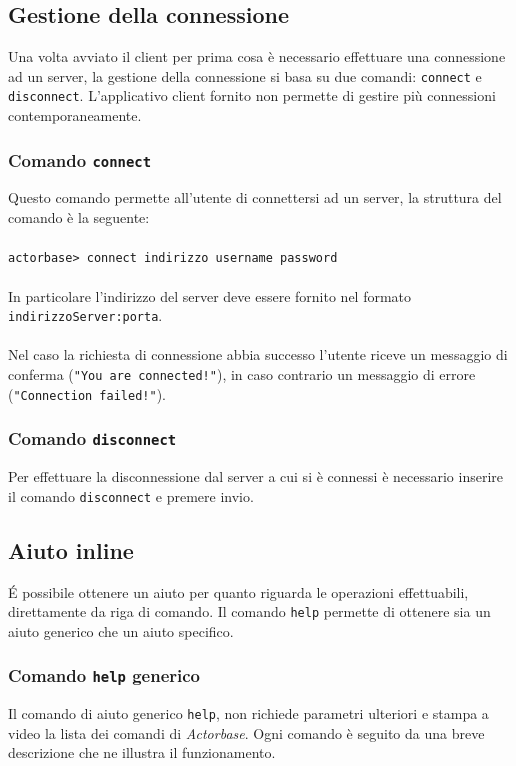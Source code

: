 \documentclass[a4paper]{article}
\begin{document}
	\subsection{Gestione della connessione}
	Una volta avviato il client per prima cosa è necessario effettuare una connessione ad un server, la gestione della connessione si basa su due comandi: \texttt{connect} e \texttt{disconnect}. L'applicativo client fornito non permette di gestire più connessioni contemporaneamente.
	
	\subsubsection{Comando \texttt{connect}}
	Questo comando permette all'utente di connettersi ad un server, la struttura del comando è la seguente:
	\\ \\
	\texttt{actorbase>	connect indirizzo username password}
	\\ \\
	In particolare l'indirizzo del server deve essere fornito nel formato \texttt{indirizzoServer:porta}. \\ \\
	Nel caso la richiesta di connessione abbia successo l'utente riceve un messaggio di conferma (\texttt{"You are connected!"}), in caso contrario un messaggio di errore (\texttt{"Connection failed!"}).
	
	\subsubsection{Comando \texttt{disconnect}}
	Per effettuare la disconnessione dal server a cui si è connessi è necessario inserire il comando \texttt{disconnect} e premere invio.
	

	\subsection{Aiuto inline}
	\'E possibile ottenere un aiuto per quanto riguarda le operazioni effettuabili, direttamente da riga di comando. Il comando \texttt{help} permette di ottenere sia un aiuto generico che un aiuto specifico.
	
	\subsubsection{Comando \texttt{help} generico}
	Il comando di aiuto generico \texttt{help}, non richiede parametri ulteriori e stampa a video la lista dei comandi di \emph{Actorbase}. Ogni comando è seguito da una breve descrizione che ne illustra il funzionamento.
	
\end{document}
